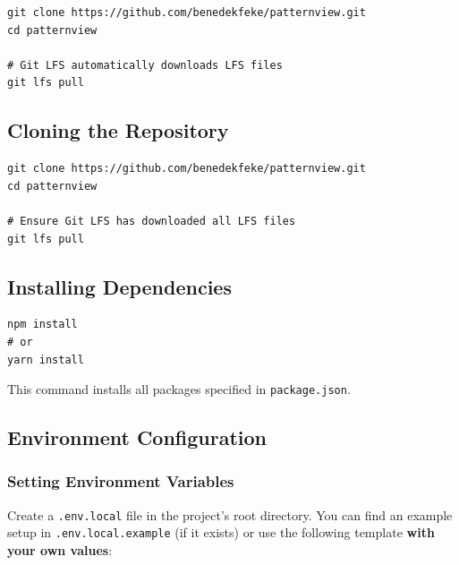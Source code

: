 \begin{verbatim}
git clone https://github.com/benedekfeke/patternview.git
cd patternview

# Git LFS automatically downloads LFS files
git lfs pull
\end{verbatim}

\subsection{Cloning the Repository}

\begin{verbatim}
git clone https://github.com/benedekfeke/patternview.git
cd patternview

# Ensure Git LFS has downloaded all LFS files
git lfs pull
\end{verbatim}

\subsection{Installing Dependencies}

\begin{verbatim}
npm install
# or
yarn install
\end{verbatim}

This command installs all packages specified in \texttt{package.json}.

\subsection{Environment Configuration}

\subsubsection{Setting Environment Variables}

Create a \texttt{.env.local} file in the project's root directory. You can find an example setup in \texttt{.env.local.example} (if it exists) or use the following template \textbf{with your own values}:

